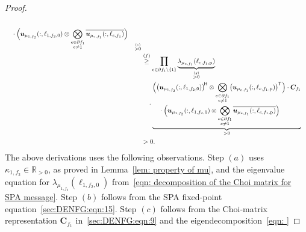 \documentclass[journal]{IEEEtran}
\newcommand{\add}[1]{{\color{black}#1}}
\newcommand{\vect}[1]{ \bm{#1} }
\newcommand{\setpf}{ \partial f }
\newcommand{\sR}{\mathbb{R}}
\newcommand{\Herm}{\mathsf{H}}
\newcommand{\tran}{\mathsf{T}}
\newcommand{\matr}[1]{\vect{#1}}
\newcommand{\etofone}{ e, f_1 }
\newcommand{\onetoftwo}{ 1, f_2 }
\begin{document}
\begin{appendices}
\begin{proof}
\begin{align}
{\begin{aligned}
          \\[-0.25ex]
           & \quad \cdot \add{\Bigl(}
          \matr{u}_{ \mu_{\onetoftwo} }
          ( :, \ell_{1,f_{2},0} )
          \otimes
          \mathop{\bigotimes}_{\substack{e \in \setpf_{1}\\ e \neq 1}}
          \overline{ \matr{u}_{\mu_{\etofone}}
            ( :, \ell_{e,f_1} ) }
          \add{\Bigr)}
        \end{aligned}
      }_{\overset{(e)}{>0}}
      \nonumber                                \\
       & \overset{(f)}{\geq}
      \prod_{e \in \setpf_{1} \setminus \{1\}}
      \underbrace{ \lambda_{\mu_{\etofone}}( \ell_{e,f_{1},\mathrm{p}} ) }_{\overset{(g)}{>0}}
      \nonumber                                \\
       & \quad\cdot
      \underbrace{
        \begin{aligned}
           & \add{\Bigl(}
          \bigl( \matr{u}_{ \mu_{\onetoftwo} }
          ( :, \ell_{1,f_{2},0} ) \bigr)^{\!\Herm}
          \otimes
          \mathop{\bigotimes}_{\substack{e \in \setpf_{1}\\ e \neq 1}}
          \bigl( \matr{u}_{\mu_{\etofone}}
          ( :, \ell_{e,f_{1},\mathrm{p}} ) \bigr)^{\tran}
          \add{\Bigr)}
          \cdot \matr{C}_{f_{1}}
          \\[-0.25ex]
           & \quad \cdot \add{\Bigl(}
          \matr{u}_{ \mu_{\onetoftwo} }
          ( :, \ell_{1,f_{2},0} )
          \otimes
          \mathop{\bigotimes}_{\substack{e \in \setpf_{1}\\ e \neq 1}}
          \overline{ \matr{u}_{\mu_{\etofone}}
            ( :, \ell_{e,f_{1},\mathrm{p}} ) }
          \add{\Bigr)}
        \end{aligned}
      }_{>0}
      \nonumber                                \\
       & >0. \label{eqn: positive of messages}
    \end{align}
    The above derivations uses the following observations. Step $(a)$ uses
    $ \kappa_{\onetoftwo} \in \sR_{>0} $, as proved in Lemma~\ref{lem:
      property of mu}, and the eigenvalue equation for
    $\lambda_{ \mu_{\onetoftwo} }( \ell_{1,f_{2},0} )$ from~\eqref{eqn:
      decomposition of the Choi matrix for SPA message}. Step $(b)$ follows
    from the SPA fixed-point equation~\eqref{sec:DENFG:eqn:15}. Step $(c)$
    follows from the Choi-matrix representation $ \matr{C}_{f_{1}} $
    in~\eqref{sec:DENFG:eqn:9} and the eigendecomposition~\eqref{eqn:
}
\end{proof}
\end{appendices}
\end{document}
